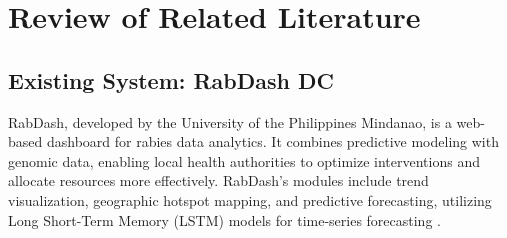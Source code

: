 \chapter{Review of Related Literature}
\label{sec:relatedlit}

\begin{comment}
A literature review is a piece of discursive prose, not a list describing or summarizing one piece of literature after another. It’s usually a bad sign to see every paragraph beginning with the name of a researcher. Instead, organize the literature review into sections that present themes or identify trends, including relevant theory. You are not trying to list all the materials published, but to synthesize and evaluate them according to the guiding concept of your thesis or research question. You should also state the limits or gaps of their researches wherein you will try to fill these gaps in accordance to your research problem and objectives.	content...
\end{comment}



\begin{comment}
	
	Guide on Writing your RRL chapter
	
	1. Identify the keywords with respect to your research
	One keyword = One document section
	Examples: 2.1 Story Generation Systems
	2.2 Knowledge Representation
	
	2.  Find references using these keywords
	
	3.  For each of the references that you find,
	Check: Is it relevant to your research?
	Use their references to find more relevant works.
	
	4. Identify a set of criteria for comparison.
	It will serve as a guide to help you focus on what to look for
	
	5. Write a summary focusing on -
	What: A short description of the work
	How: A summary of the approach it utilized
	Findings: If applicable, provide the results
	Why: Relevance to your work
	
	6. At the end of each section,  show a Table of Comparison of the related works 
	and your proposed project/system
	
\end{comment}

\section{Existing System: RabDash DC}
%
%
RabDash, developed by the University of the Philippines Mindanao, is a web-based dashboard for rabies data analytics. It combines predictive modeling with genomic data, enabling local health authorities to optimize interventions and allocate resources more effectively. RabDash's modules include trend visualization, geographic hotspot mapping, and predictive forecasting, utilizing Long Short-Term Memory (LSTM) models for time-series forecasting \cite{rabdash}. 

